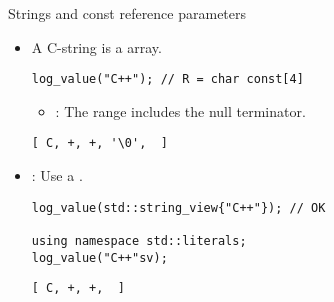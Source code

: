 \begin{frame}[t,fragile]{Strings and const reference parameters}
\begin{itemize}
  \item A C-string is a  array.
\begin{lstlisting}
log_value("C++"); // R = char const[4]
\end{lstlisting}
    \begin{itemize}
      \item {}: The range includes the null terminator.
    \end{itemize}
\begin{lstlisting}[style=terminal]
[ C, +, +, '\0',  ]
\end{lstlisting}

  \item {}: Use a .
\begin{lstlisting}
log_value(std::string_view{"C++"}); // OK

using namespace std::literals;
log_value("C++"sv);
\end{lstlisting}
\begin{lstlisting}[style=terminal]
[ C, +, +,  ]
\end{lstlisting}
\end{itemize}
\end{frame}
